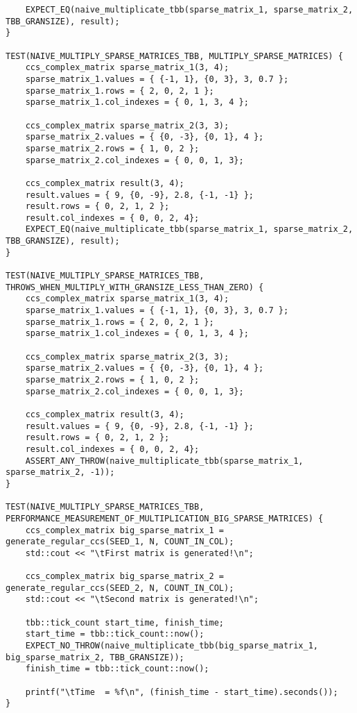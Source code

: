 \documentclass{report}
\begin{document}
\begin{lstlisting}
    EXPECT_EQ(naive_multiplicate_tbb(sparse_matrix_1, sparse_matrix_2, TBB_GRANSIZE), result);
}

TEST(NAIVE_MULTIPLY_SPARSE_MATRICES_TBB, MULTIPLY_SPARSE_MATRICES) {
    ccs_complex_matrix sparse_matrix_1(3, 4);
    sparse_matrix_1.values = { {-1, 1}, {0, 3}, 3, 0.7 };
    sparse_matrix_1.rows = { 2, 0, 2, 1 };
    sparse_matrix_1.col_indexes = { 0, 1, 3, 4 };

    ccs_complex_matrix sparse_matrix_2(3, 3);
    sparse_matrix_2.values = { {0, -3}, {0, 1}, 4 };
    sparse_matrix_2.rows = { 1, 0, 2 };
    sparse_matrix_2.col_indexes = { 0, 0, 1, 3};

    ccs_complex_matrix result(3, 4);
    result.values = { 9, {0, -9}, 2.8, {-1, -1} };
    result.rows = { 0, 2, 1, 2 };
    result.col_indexes = { 0, 0, 2, 4};
    EXPECT_EQ(naive_multiplicate_tbb(sparse_matrix_1, sparse_matrix_2, TBB_GRANSIZE), result);
}

TEST(NAIVE_MULTIPLY_SPARSE_MATRICES_TBB, THROWS_WHEN_MULTIPLY_WITH_GRANSIZE_LESS_THAN_ZERO) {
    ccs_complex_matrix sparse_matrix_1(3, 4);
    sparse_matrix_1.values = { {-1, 1}, {0, 3}, 3, 0.7 };
    sparse_matrix_1.rows = { 2, 0, 2, 1 };
    sparse_matrix_1.col_indexes = { 0, 1, 3, 4 };

    ccs_complex_matrix sparse_matrix_2(3, 3);
    sparse_matrix_2.values = { {0, -3}, {0, 1}, 4 };
    sparse_matrix_2.rows = { 1, 0, 2 };
    sparse_matrix_2.col_indexes = { 0, 0, 1, 3};

    ccs_complex_matrix result(3, 4);
    result.values = { 9, {0, -9}, 2.8, {-1, -1} };
    result.rows = { 0, 2, 1, 2 };
    result.col_indexes = { 0, 0, 2, 4};
    ASSERT_ANY_THROW(naive_multiplicate_tbb(sparse_matrix_1, sparse_matrix_2, -1));
}

TEST(NAIVE_MULTIPLY_SPARSE_MATRICES_TBB, PERFORMANCE_MEASUREMENT_OF_MULTIPLICATION_BIG_SPARSE_MATRICES) {
    ccs_complex_matrix big_sparse_matrix_1 = generate_regular_ccs(SEED_1, N, COUNT_IN_COL);
    std::cout << "\tFirst matrix is generated!\n";

    ccs_complex_matrix big_sparse_matrix_2 = generate_regular_ccs(SEED_2, N, COUNT_IN_COL);
    std::cout << "\tSecond matrix is generated!\n";

    tbb::tick_count start_time, finish_time;
    start_time = tbb::tick_count::now();
    EXPECT_NO_THROW(naive_multiplicate_tbb(big_sparse_matrix_1, big_sparse_matrix_2, TBB_GRANSIZE));
    finish_time = tbb::tick_count::now();

    printf("\tTime  = %f\n", (finish_time - start_time).seconds());
}



\end{lstlisting}
\end{document}
